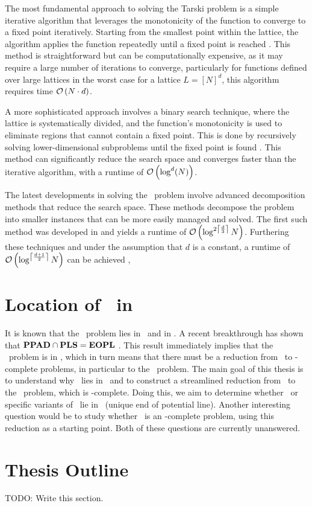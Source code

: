 The most fundamental approach to solving the Tarski problem is a simple iterative algorithm that leverages the monotonicity of the function to converge to a fixed point iteratively. Starting from the smallest point within the lattice, the algorithm applies the function repeatedly until a fixed point is reached . This method is straightforward but can be computationally expensive, as it may require a large number of iterations to converge, particularly for functions defined over large lattices in the worst case for a lattice $L = [N]^d$, this algorithm requires time $\mathcal{O}\left(N \cdot d\right)$.

A more sophisticated approach involves a binary search technique, where the lattice is systematically divided, and the function's monotonicity is used to eliminate regions that cannot contain a fixed point. This is done by recursively solving lower-dimensional subproblems until the fixed point is found . This method can significantly reduce the search space and converges faster than the iterative algorithm, with a runtime of $\mathcal{O}\left(\log^d(N)\right)$.

The latest developments in solving the \Tarski\ problem involve advanced decomposition methods that reduce the search space. These methods decompose the problem into smaller instances that can be more easily managed and solved. The first such method was developed in \cite{fearnley_faster_2022} and yields a runtime of $\mathcal{O}\left(\log^{2\left\lceil\frac{d}{3}\right\rceil}{N}\right)$. Furthering these techniques and under the assumption that $d$ is a constant, a runtime of $\mathcal{O}\left(\log^{\left\lceil\frac{d+1}{2}\right\rceil}{N}\right)$ can be achieved , 

\section{Location of \Tarski\ in \TFNP}

It is known that the \Tarski\ problem lies in \PPAD\ and in \PLS. A recent breakthrough has shown that $\textbf{PPAD} \cap \textbf{PLS} = \textbf{EOPL}$ . This result immediately implies that the \Tarski\ problem is in \EOPL, which in turn means that there must be a reduction from \Tarski\ to \EOPL-complete problems, in particular to the \EndOfPotentialLine\ problem. The main goal of this thesis is to understand why \Tarski\ lies in \EOPL\ and to construct a streamlined reduction from \Tarski\ to the \EndOfPotentialLine\ problem, which is \EOPL-complete. Doing this, we aim to determine whether \Tarski\ or specific variants of \Tarski\ lie in \UEOPL\ (unique end of potential line). Another interesting question would be to study whether \Tarski\ is an \EOPL-complete problem, using this reduction as a starting point. Both of these questions are currently unanswered.

\section{Thesis Outline}

TODO: Write this section.